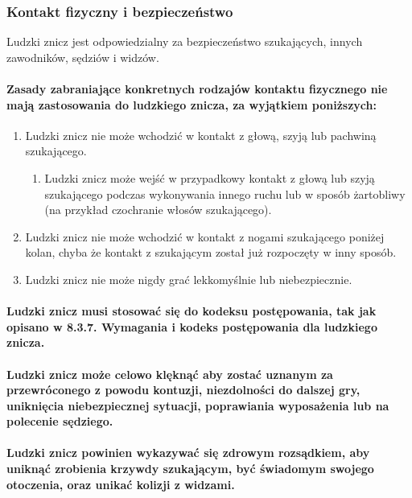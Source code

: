 \documentclass[12pt]{article}
\begin{document}
\subsubsection{Kontakt fizyczny i bezpieczeństwo}

Ludzki znicz jest odpowiedzialny za bezpieczeństwo szukających, innych
zawodników, sędziów i widzów.

\paragraph{Zasady zabraniające konkretnych rodzajów kontaktu
	fizycznego nie mają zastosowania do ludzkiego znicza, za wyjątkiem
	poniższych:}

\begin{enumerate}
	\item Ludzki znicz nie może wchodzić w kontakt z głową, szyją lub pachwiną
	      szukającego.
	      \begin{enumerate}
		      \item Ludzki znicz może wejść w przypadkowy kontakt z głową lub szyją
		            szukającego podczas wykonywania innego ruchu lub w sposób żartobliwy (na
		            przykład czochranie włosów szukającego).
	      \end{enumerate}

	\item Ludzki znicz nie może wchodzić w kontakt z nogami szukającego poniżej
	      kolan, chyba że kontakt z szukającym został już rozpoczęty w inny
	      sposób.

	\item Ludzki znicz nie może nigdy grać lekkomyślnie lub niebezpiecznie.
\end{enumerate}

\paragraph{Ludzki znicz musi stosować się do kodeksu
	postępowania, tak jak opisano w 8.3.7. Wymagania i kodeks postępowania
	dla ludzkiego znicza.}

\paragraph{Ludzki znicz może celowo klęknąć aby zostać uznanym za
	przewróconego z powodu kontuzji, niezdolności do dalszej gry, uniknięcia
	niebezpiecznej sytuacji, poprawiania wyposażenia lub na polecenie
	sędziego.}

\paragraph{Ludzki znicz powinien wykazywać się zdrowym
	rozsądkiem, aby uniknąć zrobienia krzywdy szukającym, być świadomym
	swojego otoczenia, oraz unikać kolizji z widzami.}
\end{document}
